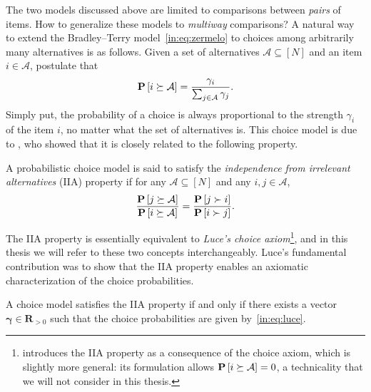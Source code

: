 The two models discussed above are limited to comparisons between \emph{pairs} of items.
How to generalize these models to \emph{multiway} comparisons?
A natural way to extend the Bradley--Terry model~\eqref{in:eq:zermelo} to choices among arbitrarily many alternatives is as follows.
Given a set of alternatives $\mathcal{A} \subseteq [N]$ and an item $i \in \mathcal{A}$, postulate that
\begin{align}
\label{in:eq:luce}
\mathbf{P}\left[ i \succeq \mathcal{A} \right] = \frac{\gamma_i}{\sum_{j \in \mathcal{A}} \gamma_j}.
\end{align}
Simply put, the probability of a choice is always proportional to the strength $\gamma_i$ of the item $i$, no matter what the set of alternatives is.
This choice model is due to \citet{luce1959individual}, who showed that it is closely related to the following property.

\begin{definition}
A probabilistic choice model is said to satisfy the \emph{independence from irrelevant alternatives} (IIA) property if for any $\mathcal{A} \subseteq [N]$ and any $i, j \in \mathcal{A}$,
\begin{align*}
\frac{\mathbf{P}\left[ j \succeq \mathcal{A} \right]}{\mathbf{P}\left[ i \succeq \mathcal{A} \right]}
     = \frac{\mathbf{P}\left[ j \succ i \right]}{\mathbf{P}\left[ i \succ j \right]}.
\end{align*}
\end{definition}

The IIA property is essentially equivalent to \emph{Luce's choice axiom}\footnote{%
\citet{luce1959individual} introduces the IIA property as a consequence of the choice axiom, which is slightly more general: its formulation allows $\mathbf{P}\left[ i \succeq \mathcal{A} \right] = 0$, a technicality that we will not consider in this thesis.},
and in this thesis we will refer to these two concepts interchangeably.
Luce's fundamental contribution was to show that the IIA property enables an axiomatic characterization of the choice probabilities.

\begin{proposition}
A choice model satisfies the IIA property if and only if there exists a vector $\bm{\gamma} \in \mathbf{R}_{>0}$ such that the choice probabilities are given by~\eqref{in:eq:luce}.
\end{proposition}

